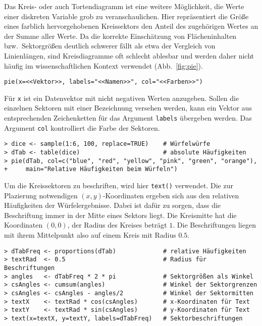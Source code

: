 Das Kreis- oder auch Tortendiagramm ist eine weitere Möglichkeit, die Werte einer diskreten Variable grob zu veranschaulichen. Hier repräsentiert die Größe eines farblich hervorgehobenen Kreissektors den Anteil des zugehörigen Wertes an der Summe aller Werte. Da die korrekte Einschätzung von Flächeninhalten bzw.\ Sektorgrößen deutlich schwerer fällt als etwa der Vergleich von Linienlängen, sind Kreisdiagramme oft schlecht ablesbar und werden daher nicht häufig im wissenschaftlichen Kontext verwendet (Abb.\ \ref{fig:pie}).
\begin{lstlisting}
pie(x=<<Vektor>>, labels="<<Namen>>", col="<<Farben>>")
\end{lstlisting}

Für \lstinline!x! ist ein Datenvektor mit nicht negativen Werten anzugeben. Sollen die einzelnen Sektoren mit einer Bezeichnung versehen werden, kann ein Vektor aus entsprechenden Zeichenketten für das Argument \lstinline!labels! übergeben werden. Das Argument \lstinline!col! kontrolliert die Farbe der Sektoren.
\begin{lstlisting}
> dice <- sample(1:6, 100, replace=TRUE)    # Würfelwürfe
> dTab <- table(dice)                       # absolute Häufigkeiten
> pie(dTab, col=c("blue", "red", "yellow", "pink", "green", "orange"),
+     main="Relative Häufigkeiten beim Würfeln")
\end{lstlisting}

Um die Kreissektoren zu beschriften, wird hier \lstinline!text()! verwendet. Die zur Plazierung notwendigen $(x, y)$-Koordinaten ergeben sich aus den relativen Häufigkeiten der Würfelergebnisse. Dabei ist dafür zu sorgen, dass die Beschriftung immer in der Mitte eines Sektors liegt. Die Kreismitte hat die Koordinaten $(0, 0)$, der Radius des Kreises beträgt $1$. Die Beschriftungen liegen mit ihrem Mittelpunkt also auf einem Kreis mit Radius $0.5$.
\begin{lstlisting}
> dTabFreq <- proportions(dTab)             # relative Häufigkeiten
> textRad  <- 0.5                           # Radius für Beschriftungen
> angles   <- dTabFreq * 2 * pi             # Sektorgrößen als Winkel
> csAngles <- cumsum(angles)                # Winkel der Sektorgrenzen
> csAngles <- csAngles - angles/2           # Winkel der Sektormitten
> textX    <- textRad * cos(csAngles)       # x-Koordinaten für Text
> textY    <- textRad * sin(csAngles)       # y-Koordinaten für Text
> text(x=textX, y=textY, labels=dTabFreq)   # Sektorbeschriftungen
\end{lstlisting}

